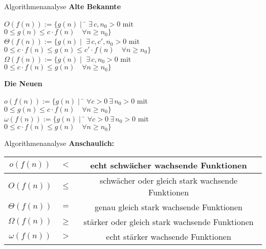 \begin{frame}{Algorithmenanalyse}
	\textbf{Alte Bekannte} \\ \vspace{-.7\baselineskip}
	\begin{tabbing}
		$O(f(n)) := \{ g(n) \mid $ \= $\exists\, c, n_0 > 0\text{ mit }$ \\
					\> $0 \leq g(n) \leq c \cdot f(n) \quad \forall n \geq n_0 \}$ \\
		$\Theta(f(n)) := \{ g(n) \mid $ \> $ \exists\, c, c', n_0 > 0\text{ mit }$ \\
					\> $0 \leq c \cdot f(n) \leq g(n) \leq c' \cdot f(n) \quad \forall n \geq n_0 \}$ \\
		$\Omega(f(n)) := \{ g(n) \mid $ \> $\exists\, c, n_0 > 0\text{ mit }$ \\
					\> $0 \leq c \cdot f(n) \leq g(n) \quad \forall n \geq n_0 \}$ 
	\end{tabbing} 
	\pause
	\smallskip
	\textbf{Die Neuen} \\ \vspace{-.7\baselineskip}
	\begin{tabbing}
		$o(f(n)) := \{g(n) \mid $ \= $\forall c > 0 \ \exists\, n_0 > 0$ mit \\
		\> $ 0 \leq g(n) \leq c \cdot f(n) \quad \forall n \geq n_0 \}$ \\
		$\omega (f(n)) := \{g(n) \mid $ \= $ \forall c > 0 \ \exists\, n_0 > 0$ mit \\
		\> $ 0 \leq c \cdot f(n) \leq g(n) \quad \forall n \geq n_0 \}$
	\end{tabbing}
\end{frame}

\begin{frame}{Algorithmenanalyse}
	\textbf{Anschaulich:} \\[0,125cm]
	{
		
		\renewcommand{\arraystretch}{2}%
		\begin{tabular}{ | c | c | c | }
			\hline
			$     o (f(n))$ & $<$ & echt schwächer wachsende Funktionen
			\\ \hline
			$     O (f(n))$ & $\leq$ & schwächer oder gleich stark wachsende Funktionen
			\\ \hline
			$\Theta (f(n))$ & $=$ & genau gleich stark wachsende Funktionen
			\\ \hline
			$\Omega (f(n))$ & $\geq$ & stärker oder gleich stark wachsende Funktionen
			\\ \hline
			$\omega (f(n))$ & $>$ & echt stärker wachsende Funktionen
			\\ \hline
		\end{tabular}
		\renewcommand{\arraystretch}{\stdarraystretch}
	}
\end{frame}


